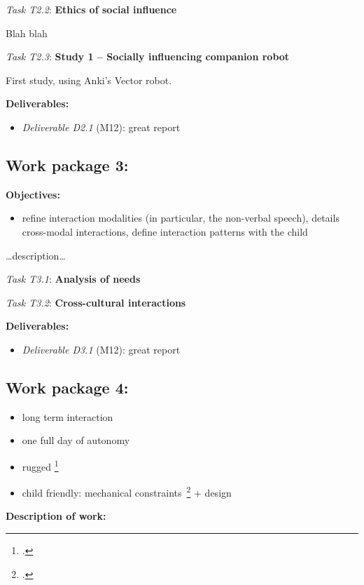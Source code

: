 \documentclass[11pt]{report}
\newcommand{\task}[2]{\vspace{0.5cm}\noindent\emph{Task T#1}: {\bf #2}\par}
\newcommand{\D}[3]{\emph{Deliverable D#1} (M#2): #3\\}
\begin{document}
\task{2.2}{Ethics of social influence}
Blah blah

\task{2.3}{Study 1 -- Socially influencing companion robot}
First study, using Anki's Vector robot.

\vspace{0.5cm}\textbf{Deliverables:}

\begin{itemize}
    \item \D{2.1}{12}{great report}
\end{itemize}

\subsection{Work package 3: \wpThree}

\textbf{Objectives:}

\begin{itemize}
    \item refine interaction modalities (in
    particular, the non-verbal speech), details cross-modal interactions,
    define interaction patterns with the child
\end{itemize}

\ldots{}description\ldots{}

\task{3.1}{Analysis of needs}
\task{3.2}{Cross-cultural interactions}

\vspace{0.5cm}\textbf{Deliverables:}

\begin{itemize}
    \item \D{3.1}{12}{great report}
\end{itemize}

\subsection{Work package 4: \wpFour}


\begin{itemize}
    \item long term interaction
    \item one full day of autonomy
    \item rugged \footcite{ozgur2017cellulo, hostettler2016realtime}
    \item child friendly: mechanical constraints~\footcite{ozgur2016permanent} + design
\end{itemize}


\textbf{Description of work:}
\end{document}
